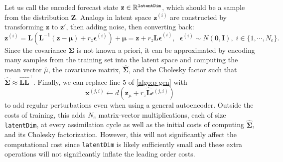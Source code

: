 \documentclass[final,3p]{elsarticle}
\theoremstyle{break}
\newcommand{\R}{\mathbb{R}}
\newcommand{\eps}{\epsilon}
\newcommand{\bb}[1]{\mathbf{#1}}
\begin{document}
Let us call the encoded forecast state $\bb{z}\in\R^{\text{{\tt latentDim}}}$, which should be a sample from the distribution $\bb{Z}$.
Analogs in latent space $\bb{z}^{(i)}$ are constructed by transforming $\bb{z}$ to $\bb{z}'$, then adding noise, then converting back:
\begin{equation}
    \bb{z}^{(i)} = \bb{L}\left(\bb{L}^{-1}\left(\bb{z}-\bb{\mu}\right) + r_z\bb{\epsilon}^{(i)}\right) +\bb{\mu}= \bb{z} + r_z\bb{L\epsilon}^{(i)},\;\; \bb{\eps}^{(i)}\sim N(\bb{0},\bb{I}),\; i\in\{1,\cdots,N_e\}.
\end{equation}
Since the covariance $\bb{\Sigma}$ is not known a priori, it can be approximated by encoding many samples from the training set into the latent space and computing the mean vector $\hat{\mu}$, the covariance matrix, $\hat{\bb{\Sigma}}$, and the Cholesky factor such that $\hat{\bb{\Sigma}}\approx\hat{\bb{L}}\hat{\bb{L}}^{\top}$.
Finally, we can replace line 5 of \cref{algo:p-gen} with
\begin{equation}
    \bb{x}^{(j,i)} \gets d(\bb{z}_{\mu} + r_z\hat{\bb{L}}\eps^{(j,i)})\label{eqn:ae_cov}
\end{equation}
to add regular perturbations even when using a general autoencoder.
Outside the costs of training, this adds $N_e$ matrix-vector multiplications, each of size {\tt latentDim}, at every assimilation cycle as well as the initial costs of computing $\hat{\bb{\Sigma}}$, and its Cholesky factorization.
However, this will not significantly affect the computational cost since {\tt latentDim} is likely sufficiently small and these extra operations will not significantly inflate the leading order costs.
\end{document}
